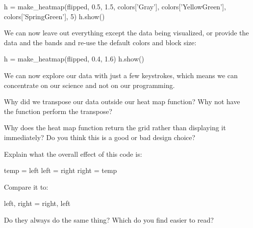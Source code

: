 \begin{VerbIn}
h = make_heatmap(flipped, 0.5, 1.5, colors['Gray'], colors['YellowGreen'], colors['SpringGreen'], 5)
h.show()
\end{VerbIn}

We can now leave out everything except the data being visualized, or
provide the data and the bands and re-use the default colors and block
size:

\begin{VerbIn}
h = make_heatmap(flipped, 0.4, 1.6)
h.show()
\end{VerbIn}

We can now explore our data with just a few keystrokes, which means we
can concentrate on our science and not on our programming.

\begin{challenge}
  Why did we transpose our data outside our heat map function? Why not
  have the function perform the transpose?
\end{challenge}

\begin{challenge}
  Why does the heat map function return the grid rather than displaying
  it immediately? Do you think this is a good or bad design choice?
\end{challenge}

\begin{challenge}
  Explain what the overall effect of this code is:
\begin{VerbIn}
temp = left
left = right
right = temp
\end{VerbIn}
Compare it to:
\begin{VerbIn}
left, right = right, left
\end{VerbIn}
  Do they always do the same thing?
  Which do you find easier to read?
\end{challenge}

